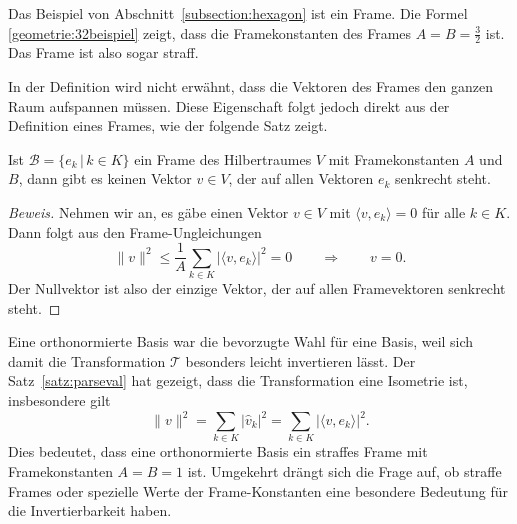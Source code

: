 \begin{beispiel}
Das Beispiel von Abschnitt~\ref{subsection:hexagon} ist ein Frame.
Die Formel \eqref{geometrie:32beispiel} zeigt, dass die Framekonstanten
des Frames $A=B=\frac32$ ist.
Das Frame ist also sogar straff.
\end{beispiel}

In der Definition wird nicht erwähnt, dass die Vektoren des Frames den
ganzen Raum aufspannen müssen.
Diese Eigenschaft folgt jedoch direkt aus der Definition eines Frames,
wie der folgende Satz zeigt.

\begin{satz}
Ist $\mathcal{B}=\{ e_k\,|\, k\in K\}$ ein Frame des Hilbertraumes $V$
mit Framekonstanten $A$ und $B$, dann gibt es keinen Vektor $v\in V$,
der auf allen Vektoren $e_k$ senkrecht steht.
\end{satz}

\begin{proof}[Beweis]
Nehmen wir an, es gäbe einen Vektor $v\in V$ mit $\langle v,e_k\rangle=0$
für alle $k\in K$.
Dann folgt aus den Frame-Ungleichungen
\[
\| v \|^2 \le \frac1{A} \sum_{k\in K} |\langle v,e_k\rangle|^2 = 0
\qquad\Rightarrow\qquad
v=0.
\]
Der Nullvektor ist also der einzige Vektor, der auf allen Framevektoren
senkrecht steht.
\end{proof}

Eine orthonormierte Basis war die bevorzugte Wahl für eine Basis, weil
sich damit die Transformation $\mathcal{T}$ besonders leicht invertieren
lässt.
Der Satz~\ref{satz:parseval} hat gezeigt, dass die Transformation %
eine Isometrie ist, insbesondere gilt
\[
\|v\|^2
=
\sum_{k\in K} |\hat{v}_k|^2
=
\sum_{k\in K} |\langle v,e_k\rangle|^2.
\]
Dies bedeutet, dass eine orthonormierte Basis ein straffes Frame mit
Framekonstanten $A=B=1$ ist.
Umgekehrt drängt sich die Frage auf, ob straffe Frames oder spezielle
Werte der Frame-Konstanten eine besondere Bedeutung für die Invertierbarkeit
haben.

